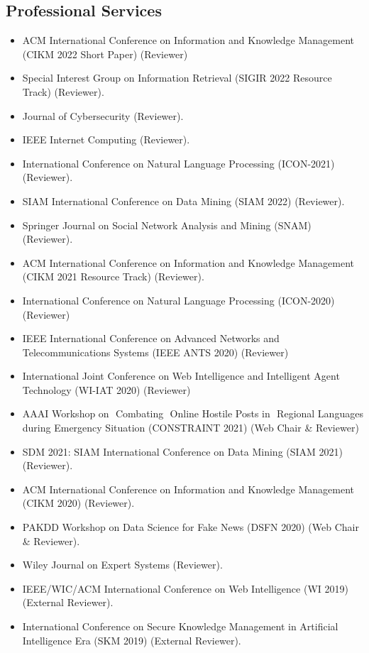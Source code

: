 \documentclass[margin, centered]{res}
\begin{document}
\begin{resume}
\section{Professional Services}
\begin{itemize}[leftmargin=*]
\item ACM International Conference on Information and Knowledge Management (CIKM 2022 Short Paper) (Reviewer)
\item Special Interest Group on Information Retrieval (SIGIR 2022 Resource Track) (Reviewer).
\item Journal of Cybersecurity (Reviewer).
\item IEEE Internet Computing (Reviewer).
\item International Conference on Natural Language Processing (ICON-2021) (Reviewer).
\item SIAM International Conference on Data Mining (SIAM 2022) (Reviewer).
\item Springer Journal on Social Network Analysis and Mining (SNAM)   (Reviewer).
   \item ACM International Conference on Information and Knowledge Management (CIKM 2021 Resource Track) (Reviewer).
    \item International Conference on Natural Language Processing (ICON-2020) (Reviewer)
    \item IEEE International Conference on Advanced Networks and Telecommunications Systems (IEEE ANTS 2020) (Reviewer)
    \item International Joint Conference on Web Intelligence and Intelligent Agent Technology (WI-IAT 2020) (Reviewer)
	\item AAAI Workshop on ​ Combating ​ On​line Ho​st​ile Posts in ​ Regional L​anguages dur​ing Emerge​ncy Si​tuation (CONSTRAINT 2021) (Web Chair \& Reviewer)
	\item SDM 2021: SIAM International Conference on Data Mining (SIAM 2021) (Reviewer).
	\item ACM International Conference on Information and Knowledge Management (CIKM 2020) (Reviewer).
	\item PAKDD Workshop on Data Science for Fake News (DSFN 2020) (Web Chair \& Reviewer).
	\item Wiley Journal on Expert Systems (Reviewer).
	\item IEEE/WIC/ACM International Conference on Web Intelligence (WI 2019) (External Reviewer).
	\item International Conference on Secure Knowledge Management in Artificial Intelligence Era (SKM 2019) (External Reviewer).
\end{itemize}


\end{resume}
\end{document}

